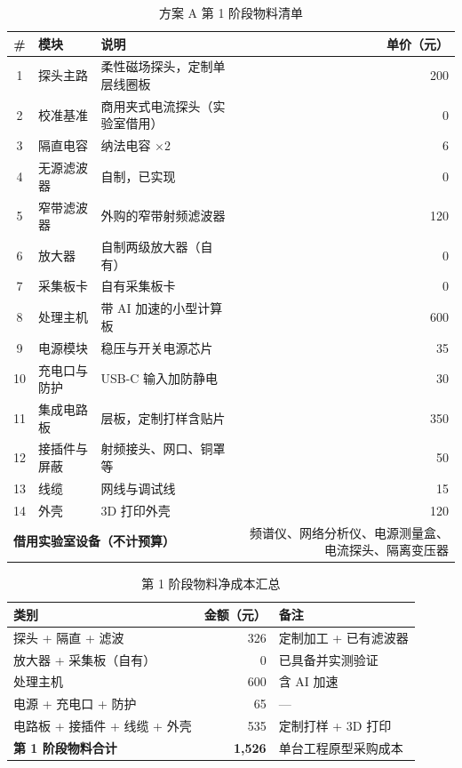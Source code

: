 \documentclass[a4paper,11pt,oneside,UTF8,scheme=plain]{ctexart}
\begin{document}
\begin{table}[H]
\centering
\caption{方案 A 第 1 阶段物料清单}
\label{tab:bom-full}
\footnotesize
\begin{tabularx}{\textwidth}{cl>{\raggedright\arraybackslash}Xr}
\toprule
\rowcolor{tableheader}
\textbf{\#} & \textbf{模块} & \textbf{说明} & \textbf{单价（元）} \\
\midrule
1  & 探头主路   & 柔性磁场探头，定制单层线圈板 & 200 \\
2  & 校准基准   & 商用夹式电流探头（实验室借用） & 0 \\
3  & 隔直电容   & 1 纳法电容 \(\times 2\) & 6 \\
4  & 无源滤波器 & 自制，已实现 & 0 \\
5  & 窄带滤波器 & 外购的窄带射频滤波器 & 120 \\
6  & 放大器     & 自制两级放大器（自有） & 0 \\
7  & 采集板卡   & 自有采集板卡 & 0 \\
8  & 处理主机   & 带 AI 加速的小型计算板 & 600 \\
9  & 电源模块   & 稳压与开关电源芯片 & 35 \\
10 & 充电口与防护 & USB-C 输入加防静电 & 30 \\
11 & 集成电路板 & 4 层板，定制打样含贴片 & 350 \\
12 & 接插件与屏蔽 & 射频接头、网口、铜罩等 & 50 \\
13 & 线缆       & 网线与调试线 & 15 \\
14 & 外壳       & 3D 打印外壳 & 120 \\
\midrule
\multicolumn{3}{l}{\textbf{借用实验室设备（不计预算）}} & 频谱仪、网络分析仪、电源测量盒、电流探头、隔离变压器 \\
\bottomrule
\end{tabularx}
\end{table}

\begin{table}[H]
\centering
\caption{第 1 阶段物料净成本汇总}
\label{tab:bom-summary}
\footnotesize
\begin{tabularx}{\textwidth}{l r>{\raggedright\arraybackslash}X}
\toprule
\rowcolor{tableheader}
\textbf{类别} & \textbf{金额（元）} & \textbf{备注} \\
\midrule
探头 + 隔直 + 滤波 & 326 & 定制加工 + 已有滤波器 \\
放大器 + 采集板（自有） & 0 & 已具备并实测验证 \\
处理主机 & 600 & 含 AI 加速 \\
电源 + 充电口 + 防护 & 65 & — \\
电路板 + 接插件 + 线缆 + 外壳 & 535 & 定制打样 + 3D 打印 \\
\textbf{第 1 阶段物料合计} & \textbf{1{,}526} & 单台工程原型采购成本 \\
\bottomrule
\end{tabularx}
\end{table}
\end{document}
